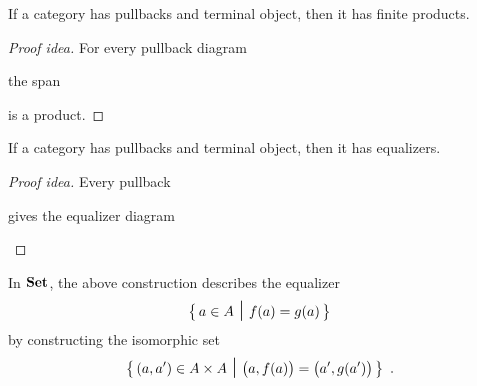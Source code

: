 \begin{lemma}
If a category has pullbacks and terminal object, then it has finite products.
\end{lemma}
\begin{proof}[Proof idea]
For every pullback diagram
\begin{center}
\end{center}
the span
\begin{center}
\end{center}
is a product.
\end{proof}

\begin{lemma}
If a category has pullbacks and terminal object, then it has equalizers.
\end{lemma}
\begin{proof}[Proof idea]
Every pullback 
\begin{center}
\end{center}
gives the equalizer diagram 
\begin{center}
\end{center}
\end{proof}

\begin{remark}
In $\mathbf {Set}$, the above construction describes the equalizer
\[
  \bigsetof{\,a\in A\ \mbox{\Large$\mid$}\ f(a) = g(a)\,}
\]
by constructing the isomorphic set
\[
  \bigsetof{\, 
    (a, a')\in A\times A\ 
    \mbox{\Large$\mid$}\
    \big(a, f(a)\big) = \big(a', g(a')\big)
    \,}
  \enspace.
\]
\end{remark}

